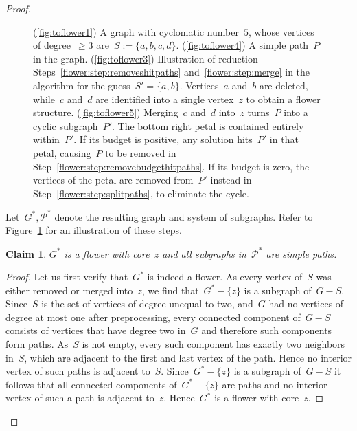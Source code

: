 \let\accentvec\vec  \documentclass{llncs}
\newtheorem{numberedclaim}{Claim}
\renewcommand{\P}{\ensuremath{\mathcal{P}}\xspace}
\begin{document}
\begin{proof}
\begin{figure}[t]
\begin{center}
\caption{(\ref{fig:toflower1}) A graph with cyclomatic number~$5$, whose vertices of degree~$\geq 3$ are~$S := \{a,b,c,d\}$. (\ref{fig:toflower4}) A simple path~$P$ in the graph. (\ref{fig:toflower3}) Illustration of reduction Steps~\ref{flower:step:removeshitpaths} and~\ref{flower:step:merge} in the algorithm for the guess~$S' = \{a,b\}$. Vertices~$a$ and~$b$ are deleted, while~$c$ and~$d$ are identified into a single vertex~$z$ to obtain a flower structure. (\ref{fig:toflower5}) Merging~$c$ and~$d$ into~$z$ turns~$P$ into a cyclic subgraph~$P'$. The bottom right petal is contained entirely within~$P'$. If its budget is positive, any solution hits~$P'$ in that petal, causing~$P$ to be removed in Step~\ref{flower:step:removebudgethitpaths}. If its budget is zero, the vertices of the petal are removed from~$P'$ instead in Step~\ref{flower:step:splitpaths}, to eliminate the cycle.}\label{fig:mergeintoflower}
\end{center}
\end{figure}

Let~$G^*, \P^*$ denote the resulting graph and system of subgraphs. Refer to Figure~\ref{fig:mergeintoflower} for an illustration of these steps.

\begin{numberedclaim}
$G^*$ is a flower with core~$z$ and all subgraphs in~$\P^*$ are simple paths.
\end{numberedclaim}
\begin{proof}
Let us first verify that~$G^*$ is indeed a flower. As every vertex of~$S$ was either removed or merged into~$z$, we find that~$G^* - \{z\}$ is a subgraph of~$G - S$. Since~$S$ is the set of vertices of degree unequal to two, and~$G$ had no vertices of degree at most one after preprocessing, every connected component of~$G - S$ consists of vertices that have degree two in~$G$ and therefore such components form paths. As~$S$ is not empty, every such component has exactly two neighbors in~$S$, which are adjacent to the first and last vertex of the path. Hence no interior vertex of such paths is adjacent to~$S$. Since~$G^* - \{z\}$ is a subgraph of~$G - S$ it follows that all connected components of~$G^* - \{z\}$ are paths and no interior vertex of such a path is adjacent to~$z$. Hence~$G^*$ is a flower with core~$z$.


\end{proof}
\end{proof}
\end{document}

